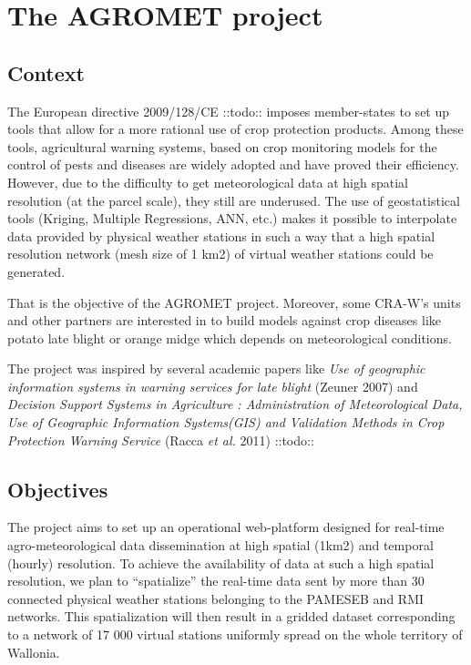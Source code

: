 \documentclass[12pt,twoside]{reedthesis}
\theoremstyle{definition}
\theoremstyle{definition}
\theoremstyle{definition}
\theoremstyle{remark}
\begin{document}
\section{The AGROMET project}\label{the-agromet-project}

\subsection{Context}\label{context}

The European directive 2009/128/CE ::todo:: imposes member-states to set
up tools that allow for a more rational use of crop protection products.
Among these tools, agricultural warning systems, based on crop
monitoring models for the control of pests and diseases are widely
adopted and have proved their efficiency. However, due to the difficulty
to get meteorological data at high spatial resolution (at the parcel
scale), they still are underused. The use of geostatistical tools
(Kriging, Multiple Regressions, ANN, etc.) makes it possible to
interpolate data provided by physical weather stations in such a way
that a high spatial resolution network (mesh size of 1 km2) of virtual
weather stations could be generated.

That is the objective of the AGROMET project. Moreover, some CRA-W's
units and other partners are interested in to build models against crop
diseases like potato late blight or orange midge which depends on
meteorological conditions.

The project was inspired by several academic papers like \emph{Use of
geographic information systems in warning services for late blight}
(Zeuner 2007) and \emph{Decision Support Systems in Agriculture :
Administration of Meteorological Data, Use of Geographic Information
Systems(GIS) and Validation Methods in Crop Protection Warning Service}
(Racca \emph{et al.} 2011) ::todo::

\subsection{Objectives}\label{objectives}

The project aims to set up an operational web-platform designed for
real-time agro-meteorological data dissemination at high spatial (1km2)
and temporal (hourly) resolution. To achieve the availability of data at
such a high spatial resolution, we plan to ``spatialize'' the real-time
data sent by more than 30 connected physical weather stations belonging
to the PAMESEB and RMI networks. This spatialization will then result in
a gridded dataset corresponding to a network of 17 000 virtual stations
uniformly spread on the whole territory of Wallonia.
\end{document}
